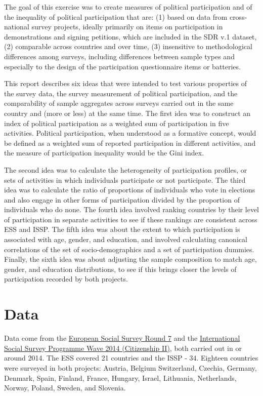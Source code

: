 \documentclass[12pt,]{article}
\begin{document}
The goal of this exercise was to create measures of political participation and of the inequality of political participation that are: (1) based on data from cross-national survey projects, ideally primarily on items on participation in demonstrations and signing petitions, which are included in the SDR v.1 dataset, (2) comparable across countries and over time, (3) insensitive to methodological differences among surveys, including differences between sample types and especially to the design of the participation questionnaire items or batteries.

This report describes six ideas that were intended to test various properties of the survey data, the survey measurement of political participation, and the comparability of sample aggregates across surveys carried out in the same country and (more or less) at the same time. The first idea was to construct an index of political participation as a weighted sum of participation in five activities. Political participation, when understood as a formative concept, would be defined as a weighted sum of reported participation in different activities, and the measure of participation inequality would be the Gini index.

The second idea was to calculate the heterogeneity of participation profiles, or sets of activities in which individuals participate or not participate. The third idea was to calculate the ratio of proportions of individuals who vote in elections and also engage in other forms of participation divided by the proportion of individuals who do none. The fourth idea involved ranking countries by their level of participation in separate activities to see if these rankings are consistent across ESS and ISSP. The fifth idea was about the extent to which participation is associated with age, gender, and education, and involved calculating canonical correlations of the set of socio-demographics and a set of participation dummies. Finally, the sixth idea was about adjusting the sample composition to match age, gender, and education distributions, to see if this brings closer the levels of participation recorded by both projects.

\hypertarget{data}{%
\section{Data}\label{data}}

Data come from the \href{https://www.europeansocialsurvey.org/data/round-index.html}{European Social Survey Round 7} and the \href{https://www.gesis.org/issp/modules/issp-modules-by-topic/citizenship/2014/}{International Social Survey Programme Wave 2014 (Citizenship II)}, both carried out in or around 2014. The ESS covered 21 countries and the ISSP - 34. Eighteen countries were surveyed in both projects: Austria, Belgium Switzerland, Czechia, Germany, Denmark, Spain, Finland, France, Hungary, Israel, Lithuania, Netherlands, Norway, Poland, Sweden, and Slovenia.
\end{document}
